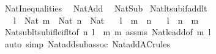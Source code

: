 %
\begin{isabellebody}%
%
%
\isadelimdocument
%
\endisadelimdocument
%
\isatagdocument
%
\isamarkuptrue%
%
\endisatagdocument
{\isafolddocument}%
%
\isadelimdocument
%
\endisadelimdocument
%
\isadelimtheory
%
\endisadelimtheory
%
\isatagtheory
{}\isamarkupfalse%
\ Nat{\isacharunderscore}{\kern0pt}Inequalities\isanewline
{}\isanewline
\ \ Nat{\isacharunderscore}{\kern0pt}Add\isanewline
\ \ Nat{\isacharunderscore}{\kern0pt}Sub\isanewline
{}%
\endisatagtheory
{\isafoldtheory}%
%
\isadelimtheory
\isanewline
%
\endisadelimtheory
\isanewline
{}\isamarkupfalse%
\ Nat{\isacharunderscore}{\kern0pt}lt{\isacharunderscore}{\kern0pt}sub{\isacharunderscore}{\kern0pt}if{\isacharunderscore}{\kern0pt}add{\isacharunderscore}{\kern0pt}lt{\isacharcolon}{\kern0pt}\isanewline
\ \ \ {\isachardoublequoteopen}l\ {\isacharcolon}{\kern0pt}\ Nat{\isachardoublequoteclose}\ {\isachardoublequoteopen}m\ {\isacharcolon}{\kern0pt}\ Nat{\isachardoublequoteclose}\ {\isachardoublequoteopen}n\ {\isacharcolon}{\kern0pt}\ Nat{\isachardoublequoteclose}\isanewline
\ \ \ {\isachardoublequoteopen}l\ {\isacharplus}{\kern0pt}\ m\ {\isacharless}{\kern0pt}\ n{\isachardoublequoteclose}\isanewline
\ \ \ {\isachardoublequoteopen}l\ {\isacharless}{\kern0pt}\ n\ {\isacharminus}{\kern0pt}\ m{\isachardoublequoteclose}\isanewline
%
\isadelimproof
\ \ %
\endisadelimproof
%
\isatagproof
{}\isamarkupfalse%
\ Nat{\isacharunderscore}{\kern0pt}sub{\isacharunderscore}{\kern0pt}lt{\isacharunderscore}{\kern0pt}sub{\isacharunderscore}{\kern0pt}if{\isacharunderscore}{\kern0pt}le{\isacharunderscore}{\kern0pt}if{\isacharunderscore}{\kern0pt}lt{\isacharbrackleft}{\kern0pt}of\ n\ {\isachardoublequoteopen}l\ {\isacharplus}{\kern0pt}\ m{\isachardoublequoteclose}\ m{\isacharbrackright}{\kern0pt}\ assms\ Nat{\isacharunderscore}{\kern0pt}le{\isacharunderscore}{\kern0pt}add{\isacharbrackleft}{\kern0pt}of\ m\ l{\isacharbrackright}{\kern0pt}\isanewline
\ \ \ \ \isamarkupfalse%
\ {\isacharparenleft}{\kern0pt}auto\ simp{\isacharcolon}{\kern0pt}\ Nat{\isacharunderscore}{\kern0pt}add{\isacharunderscore}{\kern0pt}sub{\isacharunderscore}{\kern0pt}assoc\ Nat{\isacharunderscore}{\kern0pt}add{\isacharunderscore}{\kern0pt}AC{\isacharunderscore}{\kern0pt}rules{\isacharparenright}{\kern0pt}%
\endisatagproof
{\isafoldproof}%
%
\isadelimproof
\isanewline

\end{isabellebody}

